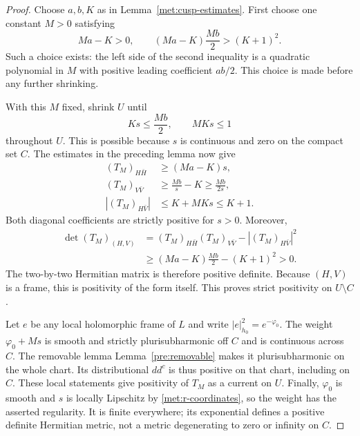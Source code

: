 \documentclass[11pt,a4paper]{article}
\numberwithin{equation}{section}
\theoremstyle{definition}
\theoremstyle{remark}
\newcommand{\ddc}{dd^{c}}
\begin{document}
\begin{proof}
Choose $a,b,K$ as in Lemma~\ref{met:cusp-estimates}. First choose one
constant $M>0$ satisfying
\begin{equation}\label{met:choose-M}
       Ma-K>0,\qquad
       (Ma-K)\frac{Mb}{2}>(K+1)^2.
\end{equation}
Such a choice exists: the left side of the second inequality is a
quadratic polynomial in $M$ with positive leading coefficient
$ab/2$. This choice is made before any further shrinking.

With this $M$ fixed, shrink $U$ until
\begin{equation}\label{met:shrink-after-M}
              Ks\le\frac{Mb}{2},\qquad MKs\le1
\end{equation}
throughout $U$. This is possible because $s$ is continuous and zero
on the compact set $C$. The estimates in the preceding lemma now give
\begin{align*}
 (T_M)_{H\bar H}&\ge(Ma-K)s,\\
 (T_M)_{V\bar V}&\ge\frac{Mb}{s}-K
                         \ge\frac{Mb}{2s},\\
 |(T_M)_{H\bar V}|&\le K+MKs\le K+1.
\end{align*}
Both diagonal coefficients are strictly positive for $s>0$. Moreover,
\begin{align*}
 \det (T_M)_{(H,V)}
 &= (T_M)_{H\bar H}(T_M)_{V\bar V}
                         -|(T_M)_{H\bar V}|^2\\
 &\ge (Ma-K)\frac{Mb}{2}-(K+1)^2>0.
\end{align*}
The two-by-two Hermitian matrix is therefore positive definite.
Because $(H,V)$ is a frame, this is positivity of the form itself.
This proves strict positivity on $U\setminus C$.

Let $e$ be any local holomorphic frame of $L$ and write
$|e|_{h_0}^2=e^{-\varphi_0}$. The weight
$\varphi_0+Ms$ is smooth and strictly plurisubharmonic off $C$ and
is continuous across $C$. The removable lemma
Lemma~\ref{pre:removable} makes it plurisubharmonic on the whole chart.
Its distributional $\ddc$ is thus positive on that chart, including
on $C$. These local statements give positivity of $T_M$ as a current
on $U$. Finally, $\varphi_0$ is smooth and $s$ is locally Lipschitz
by \eqref{met:r-coordinates}, so the weight has the asserted regularity.
It is finite everywhere; its exponential defines a positive definite
Hermitian metric, not a metric degenerating to zero or infinity on $C$.
\end{proof}
\end{document}
